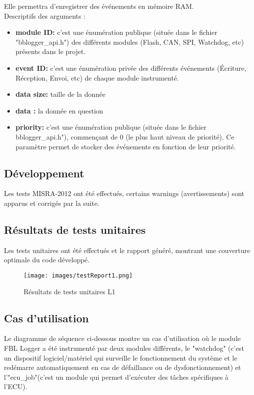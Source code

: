 \documentclass[a4paper, 12pt]{report}
\begin{document}
    Elle permettra d'enregistrer des événements en mémoire RAM.\\

    Descriptifs des arguments :\\
    \begin{itemize}
        \item \textbf{module ID:} c'est une énumération publique (située dans le fichier "bblogger\_api.h") des différents modules (Flash, CAN, SPI, Watchdog, etc) présents dans le projet.
        \item \textbf{event ID:} c'est une énumération privée des différents événements (Écriture, Réception, Envoi, etc) de chaque module instrumenté.
        \item  \textbf{data size:} taille de la donnée
        \item  \textbf{data :} la donnée en question
        \item  \textbf{priority:} c'est une énumération publique (située dans le fichier bblogger\_api.h"), commençant de 0 (le plus haut niveau de priorité). Ce paramètre permet de stocker des événements en fonction de leur priorité.
    \end{itemize}


\subsection{Développement}
Les tests MISRA-2012 ont été effectués, certains warnings (avertissements) sont apparus et corrigés par la suite.

   \subsection{Résultats de tests unitaires}
   Les tests unitaires ont été effectués et le rapport généré, montrant une couverture optimale du code développé.
   \begin{figure}[H]
       \centering
       \texttt{[image: images/testReport1.png]}
       \caption{Résultats de tests unitaires L1}
       \label{fig:testU_L1}
   \end{figure}

   \subsection{Cas d'utilisation}
   Le diagramme de séquence ci-dessous montre un cas d'utilisation où le module FBL Logger a été instrumenté par deux modules différents, le "watchdog" (c'est un dispositif logiciel/matériel  qui surveille le fonctionnement du système et le redémarre automatiquement en cas de défaillance ou de dysfonctionnement) et l'"ecu\_job"(c'est un module qui permet d'exécuter des tâches spécifiques à l'ECU).
\end{document}
